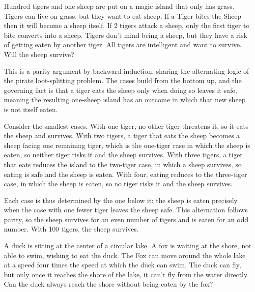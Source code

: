 \begin{problem}
Hundred tigers and one sheep are put on a magic island that only has grass. Tigers can live on grass, but they want to eat sheep. If a Tiger bites the Sheep then it will become a sheep itself. If 2 tigers attack a sheep, only the first tiger to bite converts into a sheep. Tigers don’t mind being a sheep, but they have a risk of getting eaten by another tiger. All tigers are intelligent and want to survive. Will the sheep survive?
\end{problem}

\begin{solution}
This is a parity argument by backward induction, sharing the alternating logic of the pirate loot-splitting problem. The cases build from the bottom up, and the governing fact is that a tiger eats the sheep only when doing so leaves it safe, meaning the resulting one-sheep island has an outcome in which that new sheep is not itself eaten.

Consider the smallest cases. With one tiger, no other tiger threatens it, so it eats the sheep and survives. With two tigers, a tiger that eats the sheep becomes a sheep facing one remaining tiger, which is the one-tiger case in which the sheep is eaten, so neither tiger risks it and the sheep survives. With three tigers, a tiger that eats reduces the island to the two-tiger case, in which a sheep survives, so eating is safe and the sheep is eaten. With four, eating reduces to the three-tiger case, in which the sheep is eaten, so no tiger risks it and the sheep survives.

Each case is thus determined by the one below it: the sheep is eaten precisely when the case with one fewer tiger leaves the sheep safe. This alternation follows parity, so the sheep survives for an even number of tigers and is eaten for an odd number. With 100 tigers, the sheep survives.
\end{solution}

\begin{problem}
A duck is sitting at the center of a circular lake. A fox is waiting at the shore, not able to swim, wishing to eat the duck. The Fox can move around the whole lake at a speed four times the speed at which the duck can swim. The duck can fly, but only once it reaches the shore of the lake, it can't fly from the water directly. Can the duck always reach the shore without being eaten by the fox?
\end{problem}

